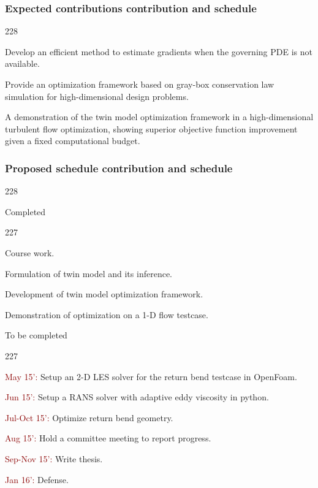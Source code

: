 \documentclass{beamer}
\newcommand{\barrow}{\item[\color{darkred}\ding{228}]}
\newcommand{\carrow}{\item[\color{darkred}\ding{227}]}
\begin{document}
\begin{frame}
    \frametitle{Expected contributions \hfill\scriptsize{contribution and schedule}}\small
    \begin{dinglist}{228}
        \barrow Develop an efficient method to estimate gradients when the governing PDE
                is not available.\vspace{.2cm}
        \barrow Provide an optimization framework based on gray-box conservation law
                simulation for high-dimensional design problems.\vspace{.2cm}
        \barrow A demonstration of the twin model optimization framework in a high-dimensional
                turbulent flow optimization, showing superior objective function improvement 
                given a fixed computational budget.
    \end{dinglist}
\end{frame}


\begin{frame}
    \frametitle{Proposed schedule \hfill\scriptsize{contribution and schedule}}\small
    \begin{dinglist}{228}
        \barrow Completed\scriptsize
        \begin{dinglist}{227}
            \carrow Course work.\vspace{.08cm}
            \carrow Formulation of twin model and its inference.\vspace{.08cm}
            \carrow Development of twin model optimization framework.\vspace{.08cm}
            \carrow Demonstration of optimization on a 1-D flow testcase.
        \end{dinglist}\vspace{.15cm}\small
        \barrow To be completed\scriptsize
        \begin{dinglist}{227}
            \carrow \textcolor{darkred}{May 15':} Setup an 2-D LES solver for the return bend testcase in OpenFoam.
            \vspace{.08cm}
            \carrow \textcolor{darkred}{Jun 15':} Setup a RANS solver with adaptive eddy viscosity in python.\vspace{.08cm}
            \carrow \textcolor{darkred}{Jul-Oct 15':} Optimize return bend geometry.\vspace{.08cm}
            \carrow \textcolor{darkred}{Aug 15':} Hold a committee meeting to report progress.\vspace{.08cm}
            \carrow \textcolor{darkred}{Sep-Nov 15':} Write thesis.\vspace{.08cm}
            \carrow \textcolor{darkred}{Jan 16':} Defense.
        \end{dinglist}
    \end{dinglist}

\end{frame}
\end{document}
